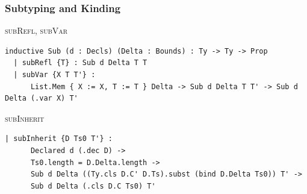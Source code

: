 \subsubsection{Subtyping and Kinding}

\begin{cmp}{\textsc{subRefl}, \textsc{subVar}}
\begin{paperside}
\qquad
{}
\end{paperside}
\begin{leanside}
\begin{lstlisting}[style=leanside]
inductive Sub (d : Decls) (Delta : Bounds) : Ty -> Ty -> Prop
  | subRefl {T} : Sub d Delta T T
  | subVar {X T T'} :
      List.Mem { X := X, T := T } Delta -> Sub d Delta T T' -> Sub d Delta (.var X) T'
\end{lstlisting}
\end{leanside}
\end{cmp}

\begin{cmp}{\textsc{subInherit}}
\begin{paperside}
\end{paperside}
\begin{leanside}
\begin{lstlisting}[style=leanside]
  | subInherit {D Ts0 T'} :
      Declared d (.dec D) ->
      Ts0.length = D.Delta.length ->
      Sub d Delta ((Ty.cls D.C' D.Ts).subst (bind D.Delta Ts0)) T' ->
      Sub d Delta (.cls D.C Ts0) T'
\end{lstlisting}
\end{leanside}
\end{cmp}

